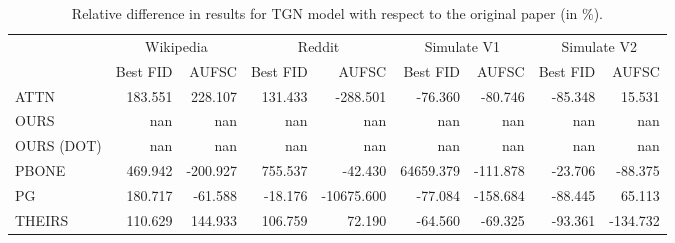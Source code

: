 \begin{table}
\centering
\begin{tabular}{lrrrrrrrr}
\toprule
 & \multicolumn{2}{c}{Wikipedia} & \multicolumn{2}{c}{Reddit} & \multicolumn{2}{c}{Simulate V1} & \multicolumn{2}{c}{Simulate V2} \\
 & Best FID & AUFSC & Best FID & AUFSC & Best FID & AUFSC & Best FID & AUFSC \\
\midrule
ATTN & 183.551 & 228.107 & 131.433 & -288.501 & -76.360 & -80.746 & -85.348 & 15.531 \\
OURS & nan & nan & nan & nan & nan & nan & nan & nan \\
OURS (DOT) & nan & nan & nan & nan & nan & nan & nan & nan \\
PBONE & 469.942 & -200.927 & 755.537 & -42.430 & 64659.379 & -111.878 & -23.706 & -88.375 \\
PG & 180.717 & -61.588 & -18.176 & -10675.600 & -77.084 & -158.684 & -88.445 & 65.113 \\
THEIRS & 110.629 & 144.933 & 106.759 & 72.190 & -64.560 & -69.325 & -93.361 & -134.732 \\
\bottomrule
\end{tabular}
\caption{\label{tab:tgn_results_diff}Relative difference in results for TGN model with respect to the original paper (in \%).}
\end{table}
